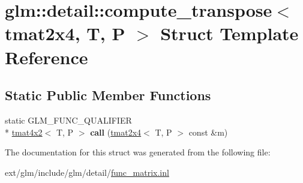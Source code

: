 \hypertarget{structglm_1_1detail_1_1compute__transpose_3_01tmat2x4_00_01_t_00_01_p_01_4}{\section{glm\-:\-:detail\-:\-:compute\-\_\-transpose$<$ tmat2x4, T, P $>$ Struct Template Reference}
\label{structglm_1_1detail_1_1compute__transpose_3_01tmat2x4_00_01_t_00_01_p_01_4}
}
\subsection*{Static Public Member Functions}
\begin{DoxyCompactItemize}
\item 
\hypertarget{structglm_1_1detail_1_1compute__transpose_3_01tmat2x4_00_01_t_00_01_p_01_4_a3affd629f440bfc05cc8361fa7e2fc97}{static G\-L\-M\-\_\-\-F\-U\-N\-C\-\_\-\-Q\-U\-A\-L\-I\-F\-I\-E\-R \\*
\hyperlink{structglm_1_1tmat4x2}{tmat4x2}$<$ T, P $>$ {\bfseries call} (\hyperlink{structglm_1_1tmat2x4}{tmat2x4}$<$ T, P $>$ const \&m)}\label{structglm_1_1detail_1_1compute__transpose_3_01tmat2x4_00_01_t_00_01_p_01_4_a3affd629f440bfc05cc8361fa7e2fc97}

\end{DoxyCompactItemize}


The documentation for this struct was generated from the following file\-:\begin{DoxyCompactItemize}
\item 
ext/glm/include/glm/detail/\hyperlink{func__matrix_8inl}{func\-\_\-matrix.\-inl}\end{DoxyCompactItemize}

